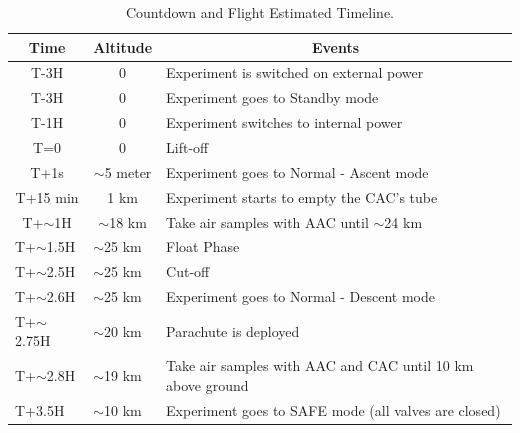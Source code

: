 \documentclass[a4paper,12pt,twoside]{article}
\begin{document}
\begin{table}[H]
\centering


\begin{tabular}{|l|l|l|}
\hline
\multicolumn{1}{|c|}{\textbf{Time}}       & \multicolumn{1}{c|}{\textbf{Altitude}}      & \multicolumn{1}{c|}{\textbf{Events}}                              \\ \hline
\multicolumn{1}{|c|}{T-3H}    & \multicolumn{1}{c|}{0}             & Experiment is switched on external power                                \\ \hline
\multicolumn{1}{|c|}{T-3H}    & \multicolumn{1}{c|}{0}             & Experiment goes to Standby mode                          \\ \hline
\multicolumn{1}{|c|}{T-1H}    & \multicolumn{1}{c|}{0}             & Experiment switches to internal power                                \\ \hline
\multicolumn{1}{|c|}{T=0}        & \multicolumn{1}{c|}{0}             & Lift-off                                                 \\ \hline
\multicolumn{1}{|c|}{T+1s}       & \multicolumn{1}{c|}{$\sim$5 meter} & Experiment goes to Normal - Ascent mode                  \\ \hline
\multicolumn{1}{|c|}{T+15 min}   & \multicolumn{1}{c|}{1 km}          & Experiment starts to empty the CAC's tube\\ \hline
\multicolumn{1}{|c|}{T+$\sim$1H} & \multicolumn{1}{c|}{$\sim$18 km}   & Take air samples with AAC until $\sim$24 km                       \\ \hline
T+$\sim$1.5H                     & $\sim$25 km                        & Float Phase                                           \\ \hline
T+$\sim$2.5H                     & $\sim$25 km                        & Cut-off                                                  \\ \hline
T+$\sim$2.6H                     & $\sim$25 km                        & Experiment goes to Normal - Descent mode                 \\ \hline
T+$\sim$2.75H                    & $\sim$20 km                        & Parachute is deployed                                    \\ \hline
T+$\sim$2.8H                     & $\sim$19 km                        & Take air samples with AAC and CAC until 10 km above ground                 \\ \hline
T+3.5H                           & $\sim$10 km                         & Experiment goes to SAFE mode (all valves are closed)                            \\ \hline
\end{tabular}
\caption{Countdown and Flight Estimated Timeline.}
\label{tab:countflight}
\end{table}
\raggedbottom
\pagebreak
\end{document}

